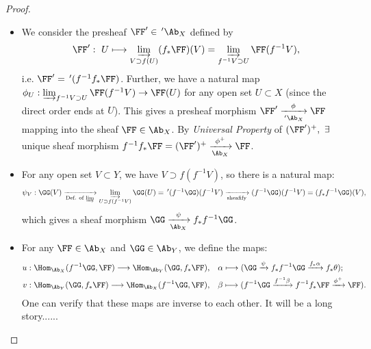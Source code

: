 \begin{proof}\mbox{}
    \begin{itemize}
        \item[(i)] We consider the presheaf $\FF'\in\,'\Ab_X$ defined by
        \begin{align*}
            \FF':\ U\longmapsto\varinjlim_{V\supset f(U)}(f_\ast\FF)(V)=\varinjlim_{f^{-1}V\supset U}\FF(f^{-1}V),
        \end{align*}
        i.e. $\FF'=\,'(f^{-1}f_\ast\FF)$. Further, we have a natural map $\phi_U:\varinjlim_{f^{-1}V\supset U}\FF(f^{-1}V)\to\FF(U)$ for any open set $U\subset X$ (since the direct order ends at $U$). This gives a presheaf morphism $\FF'\xrightarrow[\,'\Ab_X]{\phi}\FF$ mapping into the sheaf $\FF\in\Ab_X$. By \textit{Universal Property} of $(\FF')^+,\ \exists$ unique sheaf morphism $f^{-1}f_\ast\FF=(\FF')^+\xrightarrow[\Ab_X]{\phi^+}\FF$.
        \item[(ii)] For any open set $V\subset Y$, we have $V\supset f(f^{-1}V)$, so there is a natural map:
        \begin{align*}
            \psi_V:\GG(V)\xrightarrow[\text{Def. of $\varinjlim$}]{}\varinjlim_{U\supset f(f^{-1}V)}\GG(U)=\,'(f^{-1}\GG)(f^{-1}V)\xrightarrow[\text{sheafify}]{}(f^{-1}\GG)(f^{-1}V)=(f_\ast f^{-1}\GG)(V),
        \end{align*}
        which gives a sheaf morphism $\GG\xrightarrow[\Ab_X]{\psi}f_\ast f^{-1}\GG$.
        \item[(iii)] For any $\FF\in\Ab_X$ and $\GG\in\Ab_Y$, we define the maps:
        \begin{align*}
            u:\Hom_{\Ab_X}(f^{-1}\GG,\FF)\longrightarrow\Hom_{\Ab_Y}(\GG,f_\ast\FF), &\quad\alpha\longmapsto(\GG\xrightarrow{\psi}f_\ast f^{-1}\GG\xrightarrow{f_\ast\alpha}f_\ast\theta);\\
            v:\Hom_{\Ab_Y}(\GG,f_\ast\FF)\longrightarrow\Hom_{\Ab_X}(f^{-1}\GG,\FF), &\quad\beta\longmapsto(f^{-1}\GG\xrightarrow{f^{-1}\beta}f^{-1}f_\ast\FF\xrightarrow{\phi^+}\FF).
        \end{align*}
        One can verify that these maps are inverse to each other. It will be a long story......
    \end{itemize}
\end{proof}

